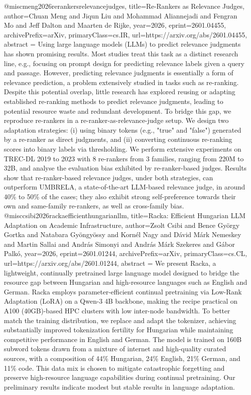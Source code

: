 {}@misc{meng2026rerankersrelevancejudges,
      title={Re-Rankers as Relevance Judges}, 
      author={Chuan Meng and Jiqun Liu and Mohammad Aliannejadi and Fengran Mo and Jeff Dalton and Maarten de Rijke},
      year={2026},
      eprint={2601.04455},
      archivePrefix={arXiv},
      primaryClass={cs.IR},
      url={https://arxiv.org/abs/2601.04455},
      abstract = {Using large language models (LLMs) to predict relevance judgments has shown promising results. Most studies treat this task as a distinct research line, e.g., focusing on prompt design for predicting relevance labels given a query and passage. However, predicting relevance judgments is essentially a form of relevance prediction, a problem extensively studied in tasks such as re-ranking. Despite this potential overlap, little research has explored reusing or adapting established re-ranking methods to predict relevance judgments, leading to potential resource waste and redundant development. To bridge this gap, we reproduce re-rankers in a re-ranker-as-relevance-judge setup. We design two adaptation strategies: (i) using binary tokens (e.g., "true" and "false") generated by a re-ranker as direct judgments, and (ii) converting continuous re-ranking scores into binary labels via thresholding. We perform extensive experiments on TREC-DL 2019 to 2023 with 8 re-rankers from 3 families, ranging from 220M to 32B, and analyse the evaluation bias exhibited by re-ranker-based judges. Results show that re-ranker-based relevance judges, under both strategies, can outperform UMBRELA, a state-of-the-art LLM-based relevance judge, in around 40\% to 50\% of the cases; they also exhibit strong self-preference towards their own and same-family re-rankers, as well as cross-family bias.}
}@misc{csibi2026rackaefficienthungarianllm,
      title={Racka: Efficient Hungarian LLM Adaptation on Academic Infrastructure}, 
      author={Zsolt Csibi and Bence György Gortka and Natabara Gyöngyössy and Kornél Nagy and Dávid Márk Nemeskey and Martin Sallai and András Simonyi and András Márk Szekeres and Gábor Palkó},
      year={2026},
      eprint={2601.01244},
      archivePrefix={arXiv},
      primaryClass={cs.CL},
      url={https://arxiv.org/abs/2601.01244},
      abstract = {We present Racka, a lightweight, continually pretrained large language model designed to bridge the resource gap between Hungarian and high-resource languages such as English and German. Racka employs parameter-efficient continual pretraining via Low-Rank Adaptation (LoRA) on a Qwen-3 4B backbone, making the recipe practical on A100 (40GB)-based HPC clusters with low inter-node bandwidth. To better match the training distribution, we replace and adapt the tokenizer, achieving substantially improved tokenization fertility for Hungarian while maintaining competitive performance in English and German. The model is trained on 160B subword tokens drawn from a mixture of internet and high-quality curated sources, with a composition of 44\% Hungarian, 24\% English, 21\% German, and 11\% code. This data mix is chosen to mitigate catastrophic forgetting and preserve high-resource language capabilities during continual pretraining. Our preliminary results indicate modest but stable results in language adaptation.}
}
